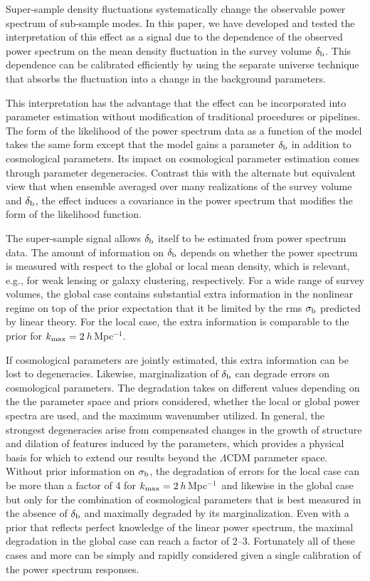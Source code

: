 \documentclass[prd,twocolumn,amsmath,amssymb,floatfix,superscriptaddress]{revtex4-1}
\newcommand{\br}{{\rm b}}
\newcommand{\hMpci}{$h\,$Mpc$^{-1}$}
\begin{document}
{{Super-sample density fluctuations systematically change the observable
 power spectrum of sub-sample modes.
In this paper, we have developed and tested the interpretation of this effect
as a signal due to the dependence of the observed power spectrum on the
mean density fluctuation in the survey volume $\delta_\br$.  This dependence
can be calibrated efficiently by using the separate universe technique that absorbs the
fluctuation into a change in the background parameters.  

This interpretation has the advantage that the effect can be incorporated
into parameter estimation without modification of traditional procedures or
pipelines.   The form of the likelihood of the power spectrum
data as a function of the model takes the same form except that the model
gains a parameter $\delta_\br$ in addition to cosmological parameters.  Its 
impact on cosmological parameter estimation comes through parameter 
degeneracies.
Contrast this with the alternate but equivalent view that when ensemble averaged over
many realizations of the survey volume and $\delta_\br$, the effect induces
a covariance in the power spectrum that modifies the form of the likelihood
function. 
 
The super-sample signal allows $\delta_\br$ itself to be estimated from power
spectrum data.    The amount of information on $\delta_\br$ depends on whether
the power spectrum is measured with respect to the global or
local mean density, which is relevant, e.g., for weak lensing or galaxy
clustering, respectively.   For a wide range of survey volumes, the global case
contains substantial extra information in the nonlinear regime on top of 
the prior expectation that it be limited by the rms $\sigma_\br$ predicted
by linear theory.   For the local case, the extra information is comparable 
to the prior for $k_{\rm max}=2\,$\hMpci. 

If cosmological parameters are jointly estimated, this extra information can be
lost to degeneracies.   Likewise, marginalization of $\delta_\br$ can degrade
errors on cosmological parameters.   
The degradation
takes on different values depending on the
 the parameter space and priors considered, whether the local or global
power spectra are used, and the maximum wavenumber 
utilized.
In general, the strongest degeneracies arise from compensated
changes in
the growth of structure and dilation of features induced by the parameters, which provides
a physical basis for which to extend our results beyond the $\Lambda$CDM parameter space.  
  Without 
prior information on $\sigma_\br$, the degradation of errors for the local case can be more than a factor of 4 for $k_{\rm max}=2\,$\hMpci\ and likewise in the global case but only for the combination of
cosmological parameters that is best measured in the absence of $\delta_\br$ and maximally degraded by its marginalization.
  Even with a prior
that reflects perfect knowledge of the linear power spectrum, the maximal degradation in the
global case can reach a factor of 2--3.  Fortunately all of these cases and more can be simply and rapidly
considered given a single calibration of the power spectrum responses.

}}
\end{document}
